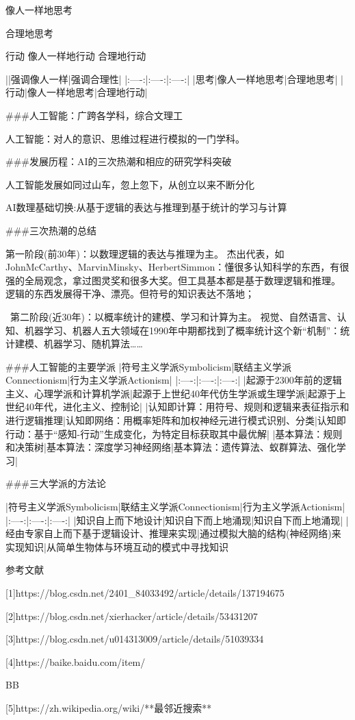 像人一样地思考

合理地思考

行动
像人一样地行动
合理地行动


||强调像人一样|强调合理性|
|:----:|:----:|:----:|
|思考|像人一样地思考|合理地思考|
|行动|像人一样地思考|合理地行动|


###人工智能：广跨各学科，综合文理工

人工智能：对人的意识、思维过程进行模拟的一门学科。

###发展历程：AI的三次热潮和相应的研究学科突破

人工智能发展如同过山车，忽上忽下，从创立以来不断分化

AI数理基础切换:从基于逻辑的表达与推理到基于统计的学习与计算

###三次热潮的总结

第一阶段(前30年)：以数理逻辑的表达与推理为主。
杰出代表，如JohnMcCarthy、MarvinMinsky、HerbertSimmon：懂很多认知科学的东西，有很强的全局观念，拿过图灵奖和很多大奖。但工具基本都是基于数理逻辑和推理。
逻辑的东西发展得干净、漂亮。但符号的知识表达不落地；


 第二阶段(近30年)：以概率统计的建模、学习和计算为主。
视觉、自然语言、认知、机器学习、机器人五大领域在1990年中期都找到了概率统计这个新“机制”：统计建模、机器学习、随机算法……


###人工智能的主要学派
|符号主义学派Symbolicism|联结主义学派Connectionism|行为主义学派Actionism|
|:----:|:----:|:----:|
|起源于2300年前的逻辑主义、心理学派和计算机学派|起源于上世纪40年代仿生学派或生理学派|起源于上世纪40年代，进化主义、控制论|
|认知即计算：用符号、规则和逻辑来表征指示和进行逻辑推理|认知即网络：用概率矩阵和加权神经元进行模式识别、分类|认知即行动：基于“感知-行动”生成变化，为特定目标获取其中最优解|
|基本算法：规则和决策树|基本算法：深度学习神经网络|基本算法：遗传算法、蚁群算法、强化学习|

###三大学派的方法论

|符号主义学派Symbolicism|联结主义学派Connectionism|行为主义学派Actionism|
|:----:|:----:|:----:|
|知识自上而下地设计|知识自下而上地涌现|知识自下而上地涌现|
|经由专家自上而下基于逻辑设计、推理来实现|通过模拟大脑的结构(神经网络)来实现知识|从简单生物体与环境互动的模式中寻找知识







参考文献

[1]https://blog.csdn.net/2401_84033492/article/details/137194675

[2]https://blog.csdn.net/xierhacker/article/details/53431207

[3]https://blog.csdn.net/u014313009/article/details/51039334

[4]https://baike.baidu.com/item/%

BB%

[5]https://zh.wikipedia.org/wiki/**最邻近搜索**

